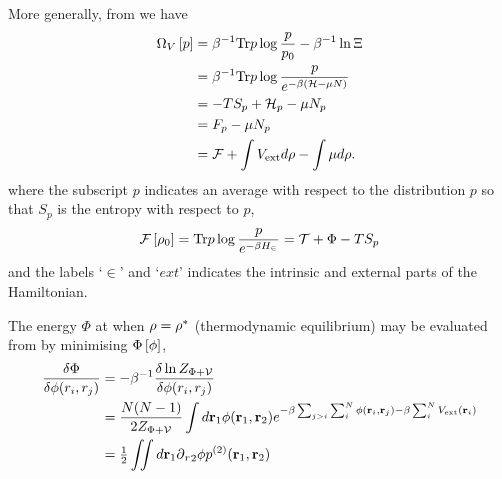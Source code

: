 More generally, from \eqnref{} we have
\begin{align}
  \Omega_V\left[ p \right] &= \beta^{-1} \textrm{Tr} p \log \frac{p}{p_0}  - \beta^{-1}\ln \Xi \\
  &= \beta^{-1} \textrm{Tr} p \log \frac{p}{e^{-\beta\left( {\cal H} - \mu N \right)}}\\
  &= - T S_p + {\cal H}_p - \mu N_p \\
  &= F_p - \mu N_p\\
 &= {\cal F} + \int V_{\text{ext}} d\rho - \int \mu d \rho.
\end{align}
where the subscript $p$ indicates an average with respect to the distribution $p$ so that  $S_p$ is the entropy with respect to $p$,
\begin{align}
 {\cal F}\left[ \rho_0 \right] = \textrm{Tr} p \log\frac{p}{e^{-\beta H_\in}} = {\cal{T}} + \Phi - TS_p
\end{align}
and the labels `$\in$' and `$ext$' indicates the intrinsic and external parts of the  Hamiltonian.

The energy $\Phi$ at when  $\rho = {\rho^\ast}$ (thermodynamic equilibrium)
may be evaluated from by minimising $\Phi\left[ \phi \right]$,
\begin{align}
\frac{\delta \Phi}{\delta \phi(r_i, r_j) } &= - \beta^{-1} \frac{\delta \ln Z_{\Phi+{\cal{V}}}}{\delta \phi(r_i, r_j)} \\
&= \frac{N(N-1)}{2 Z_{\Phi+{\cal{V}}}}\int d{\mathbf{\textbf{r}}}_1 \phi(\textbf{r}_1,\textbf{r}_2) e^{-\beta\sum_{j>i} \sum_i^N \phi(\textbf{r}_i, \textbf{r}_j)-\beta\sum_i^N V_{\text{ext}}(\textbf{r}_i)} \\
&= \tfrac{1}{2} \iint d\textbf{r}_1 {\operatorname{\partial}_r}_2 \phi p^{(2)}(\textbf{r}_1,\textbf{r}_2)
\end{align}






